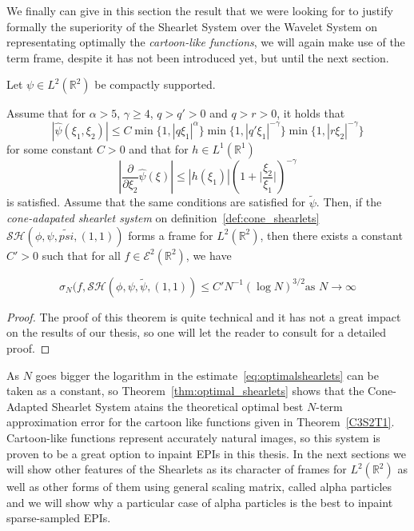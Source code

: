 We finally can give in this section the result that we were looking for to justify formally the superiority of the Shearlet System over the Wavelet System on representating optimally the \textit{cartoon-like functions}, we will again make use of the term frame, despite it has not been introduced yet, but until the next section.

\begin{thm}
\label{thm:optimal_shearlets}
Let $\psi\in L^2(\mathbb{R}^2)$ be compactly supported.

Assume that  for $\alpha>5$, $\gamma\geq 4$, $q>q'>0$ and $q>r>0$, it holds that
\begin{equation}
\label{eq:boundframe}
|\hat{\psi}(\xi_1,\xi_2)|\leq C \min\{1,|q\xi_1|^{\alpha}\}\min\{1,|q'\xi_1|^{-\gamma}\}\min\{1,|r\xi_2|^{-\gamma}\}
\end{equation}
for some constant $C>0$ and that for $h\in L^1(\mathbb{R}^1)$ 
$$
|\frac{\partial}{\partial\xi_2}\hat{\psi}(\xi)|\leq |h(\xi_1)|\left(1+\big| \frac{\xi_2}{\xi_1}\big|\right)^{-\gamma}
$$
is satisfied. Assume that the same conditions are satisfied for $\tilde{\psi}$. Then, if the \textit{cone-adapated shearlet system} on definition~\ref{def:cone_shearlets} $\mathcal{SH}(\phi,\psi,\tilde{psi},(1,1))$ forms a frame for $L^2(\mathbb{R}^2)$, then there exists a constant $C'>0$ such that for all $f\in\mathcal{E}^2(\mathbb{R}^2)$, we have 

\begin{equation}
\label{eq:optimalshearlets}
\sigma_N(f,\mathcal{SH}(\phi,\psi,\tilde{\psi},(1,1))\leq C'N^{-1}(\log N)^{3/2} \text{as  } N\longrightarrow\infty
\end{equation}
\end{thm}
\begin{proof}
The proof of this theorem is quite technical and it has not a great impact on the results of our thesis, so one will let the reader to consult \cite{FirstShearlets} for a detailed proof. 
\end{proof}

As $N$ goes bigger the logarithm in the estimate~\ref{eq:optimalshearlets} can be taken as a constant, so Theorem~\ref{thm:optimal_shearlets} shows that the Cone-Adapted Shearlet System atains the theoretical optimal best $N$-term approximation error for the cartoon like functions given in Theorem~\ref{C3S2T1}. Cartoon-like functions represent accurately natural images, so this system is proven to be a great option to inpaint EPIs in this thesis. In the next sections we will show other features of the Shearlets as its character of frames for $L^2(\mathbb{R}^2)$ as well as other forms of them using general scaling matrix, called alpha particles and we will show why a particular case of alpha particles is the best to inpaint sparse-sampled EPIs.

